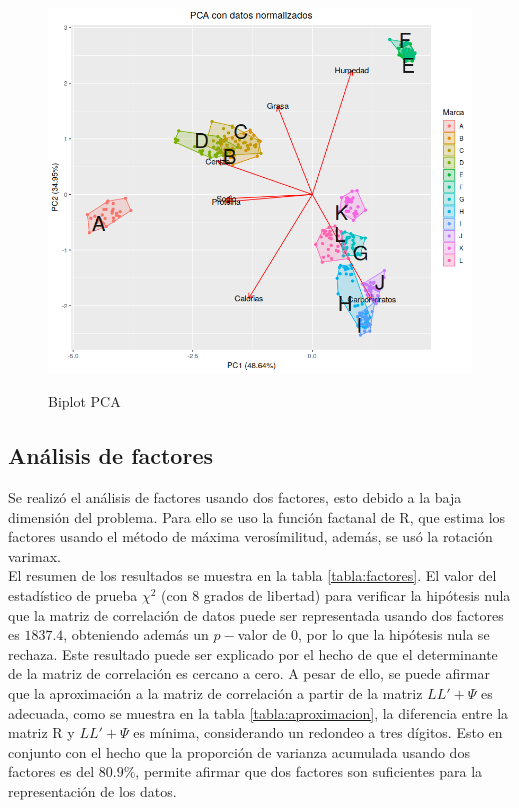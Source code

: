 \begin{figure}[h]
\centering
	\includegraphics[scale=.75]{images/biplotPCA.png} 
	\label{i_biplot_PCA}
	\caption{Biplot PCA}
\end{figure}


\restoregeometry 
\subsection{Análisis de factores}

Se realizó el análisis de factores usando dos factores, esto debido a la baja dimensión del problema. Para ello se uso la función \textsf{factanal} de R, que estima los factores usando el método de máxima verosímilitud, además, se usó la rotación varimax. \\
El resumen de los resultados se muestra en la tabla \ref{tabla:factores}. El valor del estadístico de prueba $\chi^2$ (con 8 grados de libertad) para verificar la hipótesis nula que la matriz de correlación de datos puede ser representada usando dos factores es $1837.4$, obteniendo además un $p-$valor de 0, por lo que la hipótesis nula se rechaza. Este resultado puede ser explicado por el hecho de que el determinante de la matriz de correlación es cercano a cero. A pesar de ello, se puede afirmar que la aproximación a la matriz de correlación a partir de la matriz $LL' + \Psi$ es adecuada, como se muestra en la tabla \ref{tabla:aproximacion}, la diferencia entre la matriz R y $LL' + \Psi$ es mínima, considerando un redondeo a tres dígitos. Esto en conjunto con el hecho que la proporción de varianza acumulada usando dos factores es del $80.9 \%$, permite afirmar que dos factores son suficientes para la representación de los datos.

